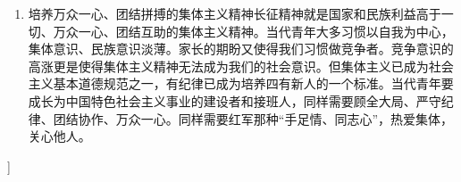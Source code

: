 \begin{enumerate}
\begin{enumerate}
{\begin{enumerate}
{					}
					\item{培养万众一心、团结拼搏的集体主义精神长征精神就是国家和民族利益高于一切、万众一心、团结互助的集体主义精神。当代青年大多习惯以自我为中心，集体意识、民族意识淡薄。家长的期盼又使得我们习惯做竞争者。竞争意识的高涨更是使得集体主义精神无法成为我们的社会意识。但集体主义已成为社会主义基本道德规范之一，有纪律已成为培养四有新人的一个标准。当代青年要成长为中国特色社会主义事业的建设者和接班人，同样需要顾全大局、严守纪律、团结协作、万众一心。同样需要红军那种“手足情、同志心”，热爱集体，关心他人。
					}
				\end{enumerate}
			}
		\end{enumerate}
	]
\end{enumerate}

